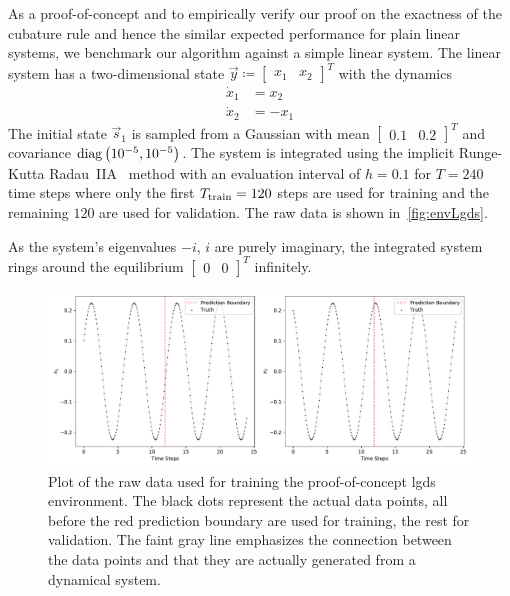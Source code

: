 			As a proof-of-concept and to empirically verify our proof on the exactness of the cubature rule and hence the similar expected performance for plain linear systems, we benchmark our algorithm against a simple linear system. The linear system has a two-dimensional state \( \vec{y} \coloneqq \begin{bmatrix} x_1 & x_2 \end{bmatrix}^T \) with the dynamics
			\begin{align*}
				\dot{x}_1 &= x_2 \\
				\dot{x}_2 &= -x_1
			\end{align*}
			The initial state \( \vec{s}_1 \) is sampled from a Gaussian with mean \( \begin{bmatrix} 0.1 & 0.2 \end{bmatrix}^T \) and covariance \( \operatorname{diag}\big(10^{-5}, 10^{-5}\big) \). The system is integrated using the implicit Runge-Kutta Radau~IIA~\cite{guglielmiImplementingRadauIIA2001} method with an evaluation interval of \( h = 0.1 \) for \( T = 240 \) time steps where only the first \( T_{\mathrm{train}} = 120 \) steps are used for training and the remaining \(120\) are used for validation. The raw data is shown in~\autoref{fig:envLgds}.

			As the system's eigenvalues \( -i \), \( i \) are purely imaginary, the integrated system rings around the equilibrium \( \begin{bmatrix} 0 & 0 \end{bmatrix}^T \) infinitely.

			\begin{figure}
				\centering
				\includegraphics[width=\linewidth]{figures/experiments/environments/observations-lgds-N0.pdf}
				\caption{Plot of the raw data used for training the proof-of-concept \ac{lgds} environment. The black dots represent the actual data points, all before the red prediction boundary are used for training, the rest for validation. The faint gray line emphasizes the connection between the data points and that they are actually generated from a dynamical system.}
				\label{fig:envLgds}
			\end{figure}


